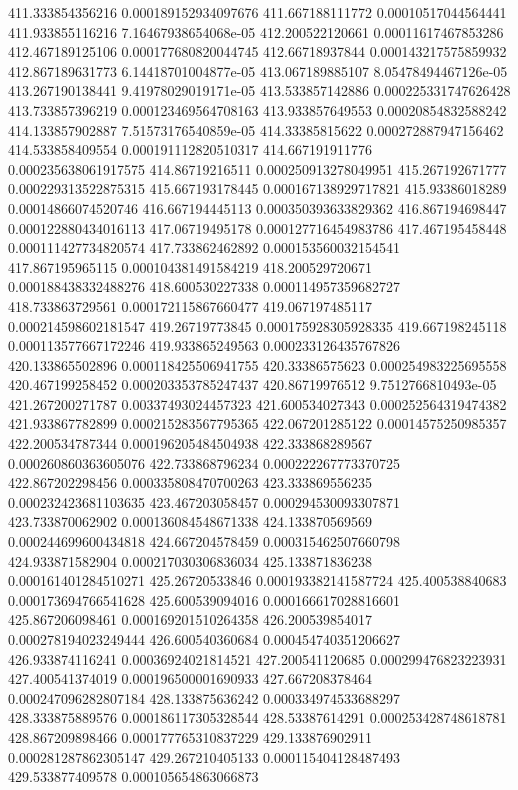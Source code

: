 {411.333854356216 0.000189152934097676
411.667188111772 0.00010517044564441
411.933855116216 7.16467938654068e-05
412.200522120661 0.00011617467853286
412.467189125106 0.000177680820044745
412.66718937844 0.000143217575859932
412.867189631773 6.14418701004877e-05
413.067189885107 8.05478494467126e-05
413.267190138441 9.41978029019171e-05
413.533857142886 0.000225331747626428
413.733857396219 0.000123469564708163
413.933857649553 0.00020854832588242
414.133857902887 7.51573176540859e-05
414.33385815622 0.000272887947156462
414.533858409554 0.000191112820510317
414.667191911776 0.000235638061917575
414.86719216511 0.000250913278049951
415.267192671777 0.000229313522875315
415.667193178445 0.000167138929717821
415.93386018289 0.00014866074520746
416.667194445113 0.000350393633829362
416.867194698447 0.000122880434016113
417.06719495178 0.000127716454983786
417.467195458448 0.000111427734820574
417.733862462892 0.000153560032154541
417.867195965115 0.000104381491584219
418.200529720671 0.000188438332488276
418.600530227338 0.000114957359682727
418.733863729561 0.000172115867660477
419.067197485117 0.000214598602181547
419.26719773845 0.000175928305928335
419.667198245118 0.000113577667172246
419.933865249563 0.000233126435767826
420.133865502896 0.000118425506941755
420.33386575623 0.000254983225695558
420.467199258452 0.000203353785247437
420.86719976512 9.7512766810493e-05
421.267200271787 0.00337493024457323
421.600534027343 0.000252564319474382
421.933867782899 0.000215283567795365
422.067201285122 0.00014575250985357
422.200534787344 0.000196205484504938
422.333868289567 0.000260860363605076
422.733868796234 0.000222267773370725
422.867202298456 0.000335808470700263
423.333869556235 0.000232423681103635
423.467203058457 0.000294530093307871
423.733870062902 0.000136084548671338
424.133870569569 0.000244699600434818
424.667204578459 0.000315462507660798
424.933871582904 0.000217030306836034
425.133871836238 0.000161401284510271
425.26720533846 0.000193382141587724
425.400538840683 0.000173694766541628
425.600539094016 0.000166617028816601
425.867206098461 0.000169201510264358
426.200539854017 0.000278194023249444
426.600540360684 0.000454740351206627
426.933874116241 0.00036924021814521
427.200541120685 0.000299476823223931
427.400541374019 0.000196500001690933
427.667208378464 0.000247096282807184
428.133875636242 0.000334974533688297
428.333875889576 0.000186117305328544
428.53387614291 0.000253428748618781
428.867209898466 0.000177765310837229
429.133876902911 0.000281287862305147
429.267210405133 0.000115404128487493
429.533877409578 0.000105654863066873
}
